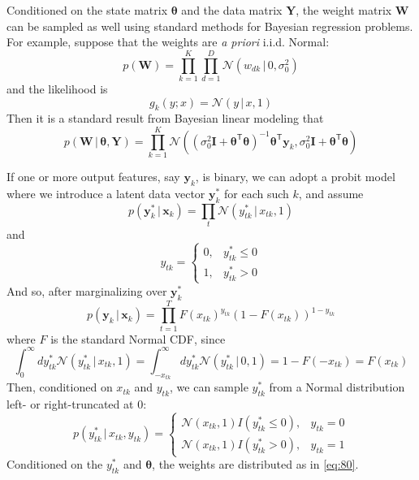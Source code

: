 \documentclass[12pt,letterpaper]{report}
\newcommand{\given}{\, \vert \,}
\newcommand{\bx}{\mathbf{x}}
\newcommand{\by}{\mathbf{y}}
\newcommand{\bY}{\mathbf{Y}}
\newcommand{\bW}{\mathbf{W}}
\newcommand{\btheta}{\boldsymbol{\theta}}
\begin{document}
Conditioned on the state matrix $\btheta$ and the data matrix $\bY$, the weight matrix $\bW$ can be sampled as well using standard methods
for Bayesian regression problems.  For example, suppose that the
weights are {\em a priori} i.i.d. Normal:
\begin{equation}
  \label{eq:78}
  p(\bW) = \prod_{k=1}^K\prod_{d=1}^D \mathcal{N}(w_{dk} \given 0,\sigma^2_0)
\end{equation}
and the likelihood is
\begin{equation}
  \label{eq:79}
  g_k(y; x) = \mathcal{N}(y \given x,1)
\end{equation}
Then it is a standard result from Bayesian linear modeling that
\begin{equation}
  \label{eq:80}
  p(\bW \given \btheta, \bY) = \prod_{k=1}^K
  \mathcal{N}\left(\left(\sigma_0^2 \mathbf{I} + \btheta^{\mathsf{T}} \btheta
    \right)^{-1}\btheta^{\mathsf{T}}\by_k, \sigma_0^2 \mathbf{I} + \btheta^{\mathsf{T}} \btheta\right)
\end{equation}

If one or more output features, say $\by_k$, is binary, we can adopt a
probit model where we introduce a latent data vector $\by^*_k$ for
each such $k$, and assume
\begin{equation}
  \label{eq:83}
  p(\by^*_{k} \given \bx_k) = \prod_{t} \mathcal{N}(y^*_{tk} \given x_{tk}, 1)
\end{equation}
and 
\begin{equation}
  \label{eq:84}
  y_{tk} = \begin{cases}
    0,& y^*_{tk} \leq 0 \\
    1,& y^*_{tk} > 0
  \end{cases}
\end{equation}
And so, after marginalizing over $\by^*_k$
\begin{equation}
  \label{eq:81}
  p(\by_k \given \bx_k) = \prod_{t=1}^T F(x_{tk})^{y_{tk}} (1 - F(x_{tk}))^{1 - y_{tk}}
\end{equation}
where $F$ is the standard Normal CDF, since
\begin{equation}
  \label{eq:85}
  \int_{0}^{\infty} dy^*_{tk} \mathcal{N}(y^*_{tk} \given x_{tk}, 1) =
  \int_{-x_{tk}}^{\infty} dy^*_{tk} \mathcal{N}(y^*_{tk} \given 0, 1)
  = 1 - F(-x_{tk}) = F(x_{tk})
\end{equation}
Then, conditioned on $x_{tk}$ and $y_{tk}$, we can sample $y^*_{tk}$ 
from a Normal distribution left- or right-truncated at 0:
\begin{equation}
  \label{eq:82}
  p(y^*_{tk} \given x_{tk}, y_{tk}) = \begin{cases}
    \mathcal{N}(x_{tk}, 1) I(y^{*}_{tk} \leq 0), & y_{tk} = 0 \\
    \mathcal{N}(x_{tk}, 1) I(y^*_{tk} > 0), & y_{tk} = 1
  \end{cases}
\end{equation}
Conditioned on the $y^*_{tk}$ and $\btheta$, the weights are
distributed as in \eqref{eq:80}.
\end{document}
